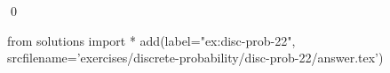 
\begin{ex} 
  \label{ex:disc-prob-22}
  
  \qed
\end{ex} 
\begin{python0}
from solutions import *
add(label="ex:disc-prob-22",
    srcfilename='exercises/discrete-probability/disc-prob-22/answer.tex') 
\end{python0}
